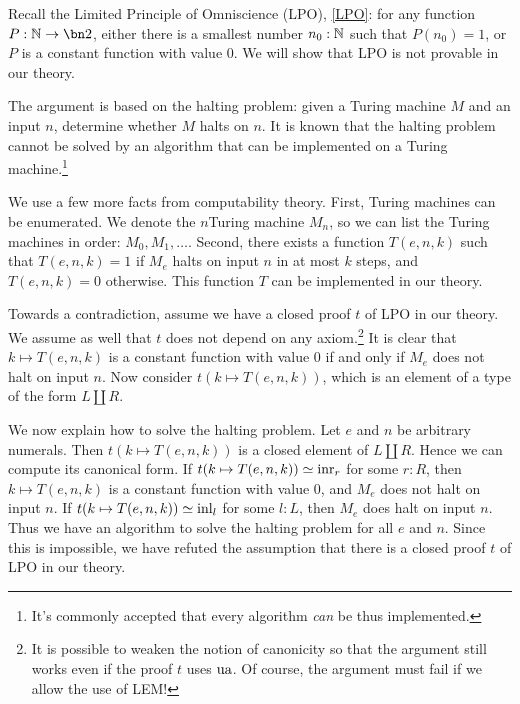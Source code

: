 \begin{remark}\label{rem:LPO-solves-halting problem}
Recall the Limited Principle of Omniscience (LPO), \cref{LPO}:
  for any function $P:\NN\to\bn 2$,
  either there is a smallest number $n_0:\mathbb{N}$ such that $P(n_0)=1$,
  or $P$ is a constant function with value $0$.
We will show that LPO is not provable in our theory.

The argument is based on the halting problem: given a Turing machine
$M$ and an input $n$, determine whether $M$ halts on $n$.
It is known that the halting problem cannot be solved by an algorithm
that can be implemented on a Turing machine.\footnote{It's commonly accepted that
  every algorithm \emph{can} be thus implemented.}

We use a few more facts from computability theory.
First, Turing machines can be enumerated. We denote the $n$\th Turing machine $M_n$,
so we can list the Turing machines in order: $M_0,M_1,\ldots$.
Second, there exists a function $T(e,n,k)$ such that $T(e,n,k) = 1$
if $M_e$ halts on input $n$ in at most $k$ steps, and $T(e,n,k) = 0$
otherwise. This function $T$ can be implemented in our theory.

Towards a contradiction, assume we have a closed proof $t$ of LPO in our theory.
We assume as well that $t$ does not depend on any axiom.\footnote{It is possible to weaken the notion
  of canonicity so that the argument still works even if the proof $t$ uses $\ua$.
Of course, the argument must fail if we allow the use of LEM!}
It is clear that $k\mapsto T(e,n,k)$ is a constant function with value $0$
if and only if $M_e$ does not halt on input $n$. Now consider $t(k\mapsto T(e,n,k))$,
which is an element of a type of the form $L\coprod R$.

We now explain how to solve the halting problem.
Let $e$ and $n$ be arbitrary numerals.
Then $t(k\mapsto T(e,n,k))$ is a closed element of $L\coprod R$.
Hence we can compute its canonical form. If $t(k\mapsto T(e,n,k))\jdeq\inr{r}$ for some
$r:R$, then $k\mapsto T(e,n,k)$ is a constant function with value $0$,
and $M_e$ does not halt on input $n$. If $t(k\mapsto T(e,n,k))\jdeq\inl{l}$ for some
$l:L$, then $M_e$ does halt on input $n$.
Thus we have an algorithm to solve the halting problem
for all $e$ and $n$. Since this is impossible, we have refuted the assumption
that there is a closed proof $t$ of LPO in our theory.
\end{remark}
